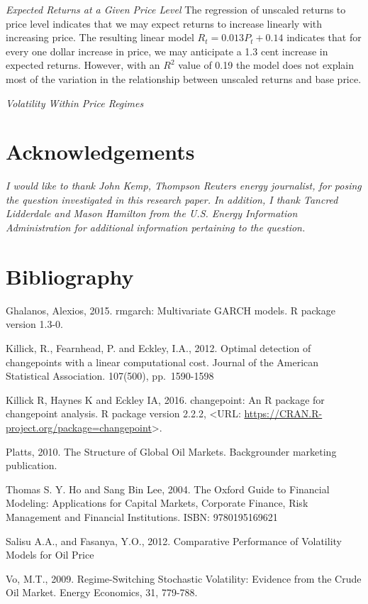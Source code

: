 \documentclass[]{article}
\begin{document}
\emph{Expected Returns at a Given Price Level} The regression of
unscaled returns to price level indicates that we may expect returns to
increase linearly with increasing price. The resulting linear model
\(R_t = 0.013P_t+0.14\) indicates that for every one dollar increase in
price, we may anticipate a 1.3 cent increase in expected returns.
However, with an \(R^2\) value of 0.19 the model does not explain most
of the variation in the relationship between unscaled returns and base
price.

\emph{Volatility Within Price Regimes}

\section{Acknowledgements}\label{acknowledgements}

\emph{I would like to thank John Kemp, Thompson Reuters energy
journalist, for posing the question investigated in this research paper.
In addition, I thank Tancred Lidderdale and Mason Hamilton from the U.S.
Energy Information Administration for additional information pertaining
to the question.}

\section{Bibliography}\label{bibliography}

Ghalanos, Alexios, 2015. rmgarch: Multivariate GARCH models. R package
version 1.3-0.

Killick, R., Fearnhead, P. and Eckley, I.A., 2012. Optimal detection of
changepoints with a linear computational cost. Journal of the American
Statistical Association. 107(500), pp.~1590-1598

Killick R, Haynes K and Eckley IA, 2016. changepoint: An R package for
changepoint analysis. R package version 2.2.2, \textless{}URL:
\url{https://CRAN.R-project.org/package=changepoint}\textgreater{}.

Platts, 2010. The Structure of Global Oil Markets. Backgrounder
marketing publication.

Thomas S. Y. Ho and Sang Bin Lee, 2004. The Oxford Guide to Financial
Modeling: Applications for Capital Markets, Corporate Finance, Risk
Management and Financial Institutions. ISBN: 9780195169621

Salisu A.A., and Fasanya, Y.O., 2012. Comparative Performance of
Volatility Models for Oil Price

Vo, M.T., 2009. Regime-Switching Stochastic Volatility: Evidence from
the Crude Oil Market. Energy Economics, 31, 779-788.
\end{document}
